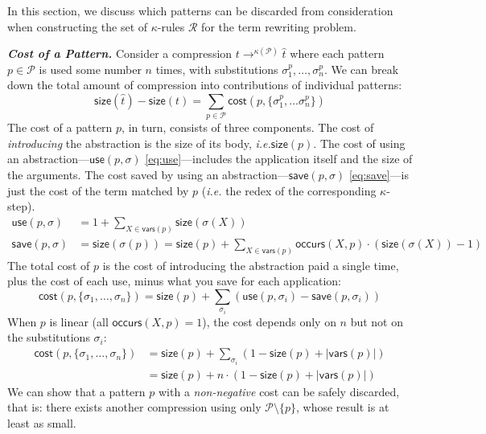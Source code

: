 \documentclass[acmsmall,screen,nonacm,review=false,timestamp=false]{acmart}
\newcommand{\ie}{\emph{i.e.}\xspace}
\newcommand{\emphbf}[1]{\emph{\textbf{#1}\xspace}}
\newcommand{\mypara}[1]{\smallskip\noindent\emphbf{#1.}\xspace}
\newcommand{\fv}{\mathsf{vars}}
\newcommand{\sz}{\mathsf{size}}
\newcommand{\sapp}[2]{{#1}({#2})}
\newcommand{\rewrites}[1]{\rightarrow^{#1}}
\newcommand{\occ}{\mathsf{occurs}}
\newcommand{\intro}{\sz}
\newcommand{\ruleset}{\mathcal{R}}
\newcommand{\patset}{\mathcal{P}}
\begin{document}
In this section, we discuss which patterns can be discarded from consideration
when constructing the set of $\kappa$-rules $\ruleset$ for the term rewriting problem.



\mypara{Cost of a Pattern}
Consider a compression $t \rewrites{\kappa(\patset)} \hat{t}$
where each pattern $p \in \patset$ is used some number $n$ times, 
with substitutions $\sigma^p_1, \ldots, \sigma^p_n$.
We can break down the total amount of compression into contributions of individual patterns:
\[
  \sz(\hat{t}) - \sz(t) = \sum_{p \in \patset} \mathsf{cost}(p, \{\sigma^p_1, \dots \sigma^p_n\})
\]
The cost of a pattern $p$, in turn, consists of three components.
The cost of \emph{introducing} the abstraction is the size of its body, \ie $\sz(p)$.
The cost of using an abstraction---$\textsf{use}(p, \sigma)$ \eqref{eq:use}---includes the application itself and the size of the arguments.
The cost saved by using an abstraction---$\textsf{save}(p, \sigma)$ \eqref{eq:save}---is just the cost of the term matched by $p$
 (\ie the redex of the corresponding $\kappa$-step).
\begin{align}
\textsf{use}(p, \sigma) &= 1 + \sum_{X \in \fv(p)} \sz(\sigma(X)) \label{eq:use} \\
  \textsf{save}(p, \sigma) &= \sz(\sapp{\sigma}{p}) = 
  \sz(p) + \sum_{X \in \fv(p)} \occ(X, p) \cdot (\sz(\sigma(X)) - 1)\label{eq:save}
\end{align}
The total cost of $p$ is 
 the cost of introducing the abstraction paid a single time,
 plus the cost of each use, minus what you save for each application:
\begin{equation}
  \textsf{cost}(p, \{\sigma_1,\ldots,\sigma_n\}) 
  = \intro(p) + \sum_{\sigma_i} (\textsf{use}(p, \sigma_i) - \textsf{save}(p, \sigma_i))
\end{equation}
When $p$ is linear (all $\occ(X, p) = 1$), 
 the cost depends only on $n$ but not on the substitutions $\sigma_i$:
\begin{align}
  \textsf{cost}(p, \{\sigma_1,\ldots,\sigma_n\}) 
  &= \intro(p) + \sum_{\sigma_i} \left(
    1 - \sz(p) + |\fv(p)|
  \right) \\
  &= \intro(p) + n \cdot \left(
    1 - \sz(p) + |\fv(p)|
  \right)
\end{align}
We can show that a pattern $p$ with a \emph{non-negative} cost can be safely discarded,
that is: there exists another compression using only $\patset \setminus \{p\}$,
whose result is at least as small.
\end{document}
